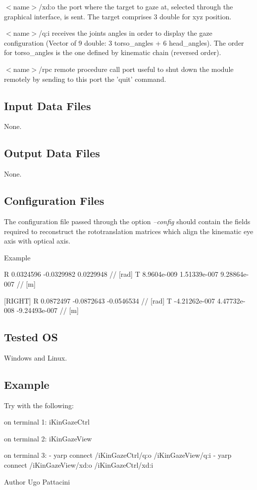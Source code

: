 \begin{DoxyItemize}
\item {\itshape } $<$name$>$/xd\+:o the port where the target to gaze at, selected through the graphical interface, is sent. The target comprises 3 double for xyz position.
\item {\itshape } $<$name$>$/q\+:i receives the joints angles in order to display the gaze configuration (Vector of 9 double\+: 3 torso\+\_\+angles + 6 head\+\_\+angles). The order for torso\+\_\+angles is the one defined by kinematic chain (reversed order).
\item {\itshape } $<$name$>$/rpc remote procedure call port useful to shut down the module remotely by sending to this port the 'quit' command.
\end{DoxyItemize}\hypertarget{group__signalScope_in_files_sec}{}\subsection{Input Data Files}\label{group__signalScope_in_files_sec}
None.\hypertarget{group__signalScope_out_data_sec}{}\subsection{Output Data Files}\label{group__signalScope_out_data_sec}
None.\hypertarget{group__signalScope_conf_file_sec}{}\subsection{Configuration Files}\label{group__signalScope_conf_file_sec}
The configuration file passed through the option {\itshape --config} should contain the fields required to reconstruct the rototranslation matrices which align the kinematic eye axis with optical axis.

Example


\begin{DoxyCode}
[LEFT]
R      0.0324596 -0.0329982 0.0229948               \textcolor{comment}{// [rad]}
T      8.9604e-009 1.51339e-007 9.28864e-007        \textcolor{comment}{// [m]}

[RIGHT]
R      0.0872497 -0.0872643 -0.0546534              \textcolor{comment}{// [rad]}
T      -4.21262e-007 4.47732e-008 -9.24493e-007     \textcolor{comment}{// [m]}
\end{DoxyCode}
\hypertarget{group__icub__tld_tested_os_sec}{}\subsection{Tested O\+S}\label{group__icub__tld_tested_os_sec}
Windows and Linux.\hypertarget{group__signalScope_example_sec}{}\subsection{Example}\label{group__signalScope_example_sec}
Try with the following\+:


\begin{DoxyCode}
on terminal 1: iKinGazeCtrl 
 
on terminal 2: iKinGazeView 
 
on terminal 3: 
- yarp connect /iKinGazeCtrl/q:o  /iKinGazeView/q:i 
- yarp connect /iKinGazeView/xd:o /iKinGazeCtrl/xd:i 
\end{DoxyCode}


\begin{DoxyAuthor}{Author}
Ugo Pattacini 
\end{DoxyAuthor}
